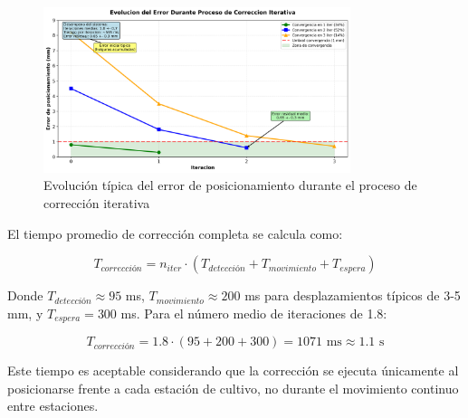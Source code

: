 \begin{figure}[h]
\centering
\includegraphics[width=0.8\textwidth]{imagenes/evolucion_error_correccion.png}
\caption{Evolución típica del error de posicionamiento durante el proceso de corrección iterativa}
\label{fig:evolucion_error}
\end{figure}

El tiempo promedio de corrección completa se calcula como:

\begin{equation}
T_{corrección} = n_{iter} \cdot (T_{detección} + T_{movimiento} + T_{espera})
\end{equation}

Donde $T_{detección} \approx 95$ ms, $T_{movimiento} \approx 200$ ms para desplazamientos típicos de 3-5 mm, y $T_{espera} = 300$ ms. Para el número medio de iteraciones de 1.8:

\begin{equation}
T_{corrección} = 1.8 \cdot (95 + 200 + 300) = 1071 \text{ ms} \approx 1.1 \text{ s}
\end{equation}

Este tiempo es aceptable considerando que la corrección se ejecuta únicamente al posicionarse frente a cada estación de cultivo, no durante el movimiento continuo entre estaciones.